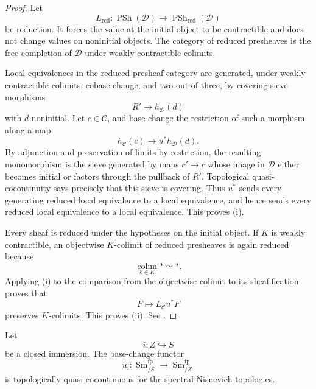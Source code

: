 \begin{proof}
Let
\[
    L_{\mathrm{red}}
    \colon
    \operatorname{PSh}(\mathcal D)
    \longrightarrow
    \operatorname{PSh}_{\mathrm{red}}(\mathcal D)
\]
be reduction.  It forces the value at the initial object to be
contractible and does not change values on noninitial objects.  The
category of reduced presheaves is the free completion of \(\mathcal D\)
under weakly contractible colimits.

Local equivalences in the reduced presheaf category are generated,
under weakly contractible colimits, cobase change, and two-out-of-three,
by covering-sieve morphisms
\[
    R'
    \longrightarrow
    h_{\mathcal D}(d)
\]
with \(d\) noninitial.  Let \(c\in\mathcal C\), and base-change the
restriction of such a morphism along a map
\[
    h_{\mathcal C}(c)
    \longrightarrow
    u^*h_{\mathcal D}(d).
\]
By adjunction and preservation of limits by restriction, the resulting
monomorphism is the sieve generated by maps \(c'\to c\) whose image in
\(\mathcal D\) either becomes initial or factors through the pullback of
\(R'\).  Topological quasi-cocontinuity says precisely that this sieve
is covering.  Thus \(u^*\) sends every generating reduced local
equivalence to a local equivalence, and hence sends every reduced local
equivalence to a local equivalence.  This proves (i).

Every sheaf is reduced under the hypotheses on the initial object.  If
\(K\) is weakly contractible, an objectwise \(K\)-colimit of reduced
presheaves is again reduced because
\[
    \operatorname*{colim}_{k\in K}*
    \simeq
    *.
\]
Applying (i) to the comparison from the objectwise colimit to its
sheafification proves that
\[
    F
    \longmapsto
    L_{\mathcal C}u^*F
\]
preserves \(K\)-colimits.  This proves (ii).  See
\cite{KhanBraveNewMotivicI}.
\end{proof}

\begin{lemma}
\label{lem:closed-base-change-quasi-cocontinuous}
Let
\[
    i
    \colon
    Z
    \hookrightarrow
    S
\]
be a closed immersion.  The base-change functor
\[
    u_i
    \colon
    \operatorname{Sm}^{\mathrm{fp}}_{/S}
    \longrightarrow
    \operatorname{Sm}^{\mathrm{fp}}_{/Z}
\]
is topologically quasi-cocontinuous for the spectral Nisnevich
topologies.
\end{lemma}

